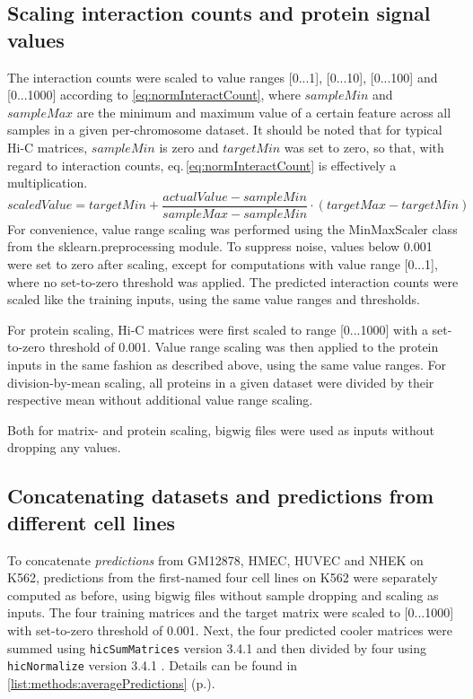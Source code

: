 \subsection{Scaling interaction counts and protein signal values} \label{sec:methods:normalization}
The interaction counts were scaled to value ranges [0...1], [0...10], [0...100] and [0...1000] 
according to \autoref{eq:normInteractCount}, 
where $sampleMin$ and $sampleMax$ are the minimum and maximum value of a certain feature 
across all samples in a given per-chromosome dataset.
It should be noted that for typical Hi-C matrices, $sampleMin$ is zero and $targetMin$ was
set to zero, so that, with regard to interaction counts, eq.\,\ref{eq:normInteractCount} is effectively a multiplication.
\begin{equation}\label{eq:normInteractCount}
 scaledValue = targetMin + \frac{actualValue - sampleMin}{sampleMax - 
sampleMin} \cdot (targetMax - targetMin)
\end{equation}
For convenience, value range scaling was performed using the MinMaxScaler class from
the sklearn.preprocessing module.
To suppress noise, values below 0.001 were set to zero after scaling, 
except for computations with value range [0...1], where no set-to-zero threshold was applied.
The predicted interaction counts were scaled like the training inputs, using the same value ranges and thresholds.

For protein scaling, Hi-C matrices were first scaled to range [0...1000] with a set-to-zero threshold of 0.001.
Value range scaling was then applied to the protein inputs in the same fashion as described above, using the same value ranges.
For division-by-mean scaling, all proteins in a given dataset 
were divided by their respective mean without additional value range scaling.

Both for matrix- and protein scaling, bigwig files were used as inputs without dropping any values. 

\subsection{Concatenating datasets and predictions from different cell lines} \label{sec:methods:concatenating}
To concatenate \emph{predictions} from GM12878, HMEC, HUVEC and NHEK on K562,
predictions from the first-named four cell lines on K562 were separately computed as before, 
using bigwig files without sample dropping and scaling as inputs.
The four training matrices and the target matrix were scaled to [0...1000] with set-to-zero threshold of 0.001.
Next, the four predicted cooler matrices were summed using \texttt{hicSumMatrices} version 3.4.1
and then divided by four using \texttt{hicNormalize} version 3.4.1 \cite{Ramirez2016}.
Details can be found in \autoref{list:methods:averagePredictions} (p.\;\pageref{list:methods:averagePredictions}).

